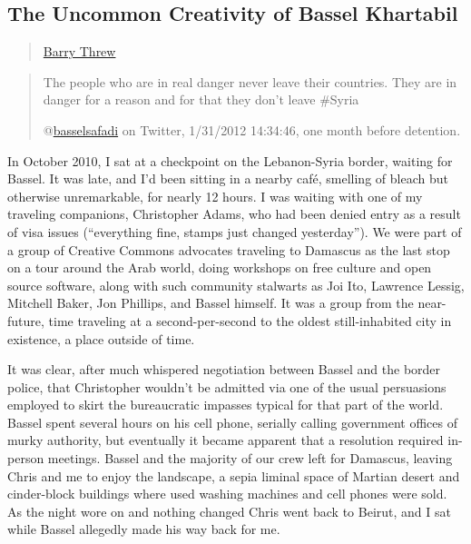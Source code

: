 \subsection{The Uncommon Creativity of Bassel
Khartabil}\label{the-uncommon-creativity-of-bassel-khartabil}

\begin{quote}
\href{../appendix/attributions.html\#barry-threw}{Barry Threw}
\end{quote}

\begin{quote}
The people who are in real danger never leave their countries. They are
in danger for a reason and for that they don't leave \#Syria

@\href{https://twitter.com/basselsafadi/status/164355948582932480}{basselsafadi}
on Twitter, 1/31/2012 14:34:46, one month before detention.
\end{quote}

In October 2010, I sat at a checkpoint on the Lebanon-Syria border,
waiting for Bassel. It was late, and I'd been sitting in a nearby café,
smelling of bleach but otherwise unremarkable, for nearly 12 hours. I
was waiting with one of my traveling companions, Christopher Adams, who
had been denied entry as a result of visa issues (``everything fine,
stamps just changed yesterday''). We were part of a group of Creative
Commons advocates traveling to Damascus as the last stop on a tour
around the Arab world, doing workshops on free culture and open source
software, along with such community stalwarts as Joi Ito, Lawrence
Lessig, Mitchell Baker, Jon Phillips, and Bassel himself. It was a group
from the near-future, time traveling at a second-per-second to the
oldest still-inhabited city in existence, a place outside of time.

It was clear, after much whispered negotiation between Bassel and the
border police, that Christopher wouldn't be admitted via one of the
usual persuasions employed to skirt the bureaucratic impasses typical
for that part of the world. Bassel spent several hours on his cell
phone, serially calling government offices of murky authority, but
eventually it became apparent that a resolution required in-person
meetings. Bassel and the majority of our crew left for Damascus, leaving
Chris and me to enjoy the landscape, a sepia liminal space of Martian
desert and cinder-block buildings where used washing machines and cell
phones were sold. As the night wore on and nothing changed Chris went
back to Beirut, and I sat while Bassel allegedly made his way back for
me.

